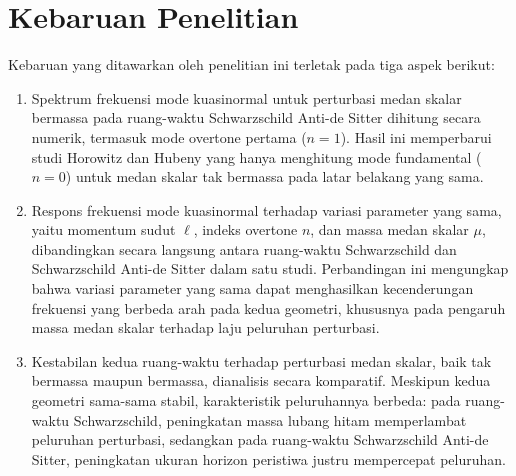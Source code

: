 \section{Kebaruan Penelitian}
\label{sec:kebaruan-penelitian}

Kebaruan yang ditawarkan oleh penelitian ini terletak pada tiga aspek berikut:

\begin{enumerate}
    \item Spektrum frekuensi mode kuasinormal untuk perturbasi medan skalar bermassa pada ruang-waktu Schwarzschild Anti-de Sitter dihitung secara numerik, termasuk mode overtone pertama ($n=1$). Hasil ini memperbarui studi Horowitz dan Hubeny \parencite{Horowitz2000} yang hanya menghitung mode fundamental ($n=0$) untuk medan skalar tak bermassa pada latar belakang yang sama.

    \item Respons frekuensi mode kuasinormal terhadap variasi parameter yang sama, yaitu momentum sudut $\ell$, indeks overtone $n$, dan massa medan skalar $\mu$, dibandingkan secara langsung antara ruang-waktu Schwarzschild dan Schwarzschild Anti-de Sitter dalam satu studi. Perbandingan ini mengungkap bahwa variasi parameter yang sama dapat menghasilkan kecenderungan frekuensi yang berbeda arah pada kedua geometri, khususnya pada pengaruh massa medan skalar terhadap laju peluruhan perturbasi.

    \item Kestabilan kedua ruang-waktu terhadap perturbasi medan skalar, baik tak bermassa maupun bermassa, dianalisis secara komparatif. Meskipun kedua geometri sama-sama stabil, karakteristik peluruhannya berbeda: pada ruang-waktu Schwarzschild, peningkatan massa lubang hitam memperlambat peluruhan perturbasi, sedangkan pada ruang-waktu Schwarzschild Anti-de Sitter, peningkatan ukuran horizon peristiwa justru mempercepat peluruhan.
\end{enumerate}